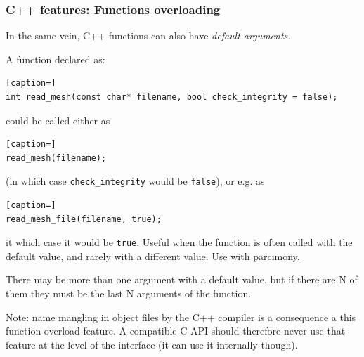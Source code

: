 \documentclass[8pt]{beamer}
\begin{document}
\begin{frame}[containsverbatim]
\frametitle{C++ features: Functions overloading}
In the same vein, C++ functions can also have {\it default arguments}. 

\medskip

A function declared as:
\begin{lstlisting}[caption=]
int read_mesh(const char* filename, bool check_integrity = false);
\end{lstlisting}
could be called either as
\begin{lstlisting}[caption=]
read_mesh(filename);
\end{lstlisting}
(in which case {\tt check\_integrity} would be {\tt false}), or e.g. as 
\begin{lstlisting}[caption=]
read_mesh_file(filename, true);
\end{lstlisting}
it which case it would be {\tt true}. Useful when the function is often called with
the default value, and rarely with a different value. Use with parcimony.  

\medskip

There may be more than one argument with a default value, but if there are N of
them they must be the last N arguments of the function.

\medskip

Note: name mangling in object files by the C++ compiler is a consequence a
this function overload feature. A compatible C API should therefore never
use that feature at the level of the interface (it can use it internally though).

\end{frame}
\end{document}
